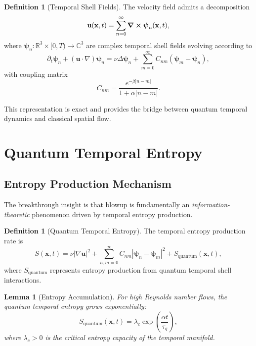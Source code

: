 \documentclass[11pt,a4paper]{article}
\newtheorem{lemma}[theorem]{Lemma}
\theoremstyle{definition}
\newtheorem{definition}[theorem]{Definition}
\newcommand{\R}{\mathbb{R}}
\newcommand{\C}{\mathbb{C}}
\begin{document}
\begin{definition}[Temporal Shell Fields]
The velocity field admits a decomposition
\begin{equation}\label{eq:shell_decomp}
\mathbf{u}(\mathbf{x}, t) = \sum_{n=0}^\infty \curl \boldsymbol{\psi}_n(\mathbf{x}, t),
\end{equation}
where $\boldsymbol{\psi}_n: \R^3 \times [0,T) \to \C^3$ are complex temporal shell fields evolving according to
\begin{equation}\label{eq:shell_evolution}
\partial_t \boldsymbol{\psi}_n + (\mathbf{u} \cdot \nabla)\boldsymbol{\psi}_n = \nu \Delta \boldsymbol{\psi}_n + \sum_{m=0}^\infty C_{nm}(\boldsymbol{\psi}_m - \boldsymbol{\psi}_n),
\end{equation}
with coupling matrix
\begin{equation}
C_{nm} = \frac{e^{-\beta|n-m|}}{1 + \alpha|n-m|}.
\end{equation}
\end{definition}

This representation is exact and provides the bridge between quantum temporal dynamics and classical spatial flow.

\section{Quantum Temporal Entropy}

\subsection{Entropy Production Mechanism}

The breakthrough insight is that blowup is fundamentally an \emph{information-theoretic} phenomenon driven by temporal entropy production.

\begin{definition}[Quantum Temporal Entropy]
The temporal entropy production rate is
\begin{equation}\label{eq:entropy}
S(\mathbf{x}, t) = \nu |\nabla \mathbf{u}|^2 + \sum_{n,m=0}^\infty C_{nm}|\boldsymbol{\psi}_n - \boldsymbol{\psi}_m|^2 + S_{\text{quantum}}(\mathbf{x}, t),
\end{equation}
where $S_{\text{quantum}}$ represents entropy production from quantum temporal shell interactions.
\end{definition}

\begin{lemma}[Entropy Accumulation]\label{lem:entropy}
For high Reynolds number flows, the quantum temporal entropy grows exponentially:
\begin{equation}
S_{\text{quantum}}(\mathbf{x}, t) = \lambda_c \exp\left(\frac{\alpha t}{\tau_q}\right),
\end{equation}
where $\lambda_c > 0$ is the critical entropy capacity of the temporal manifold.
\end{lemma}
\end{document}
